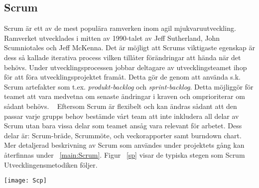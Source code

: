 \subsection{Scrum}
Scrum är ett av de mest populära ramverken inom agil mjukvaruutveckling. Ramverket utvecklades i mitten av 1990-talet av Jeff Sutherland, John Scumniotales och Jeff McKenna. Det är möjligt att Scrums viktigaste egenskap är dess så kallade iterativa process vilken tillåter förändringar att hända när det behövs. Under utvecklingsprocessen jobbar deltagare av utvecklingsteamet ihop för att föra utvecklingsprojektet framåt. Detta gör de genom att använda s.k.  Scrum artefakter som t.ex. \textit{produkt-backlog} och \textit{sprint-backlog}. Detta möjliggör för teamet att vara medvetna om senaste ändringar i kraven och omprioriterar om sådant behövs. ~\cite{aamir2017incorporating} Eftersom Scrum är flexibelt och kan ändras sådant att den passar varje grupps behov bestämde vårt team att inte inkludera all delar av Scrum utan bara vissa delar som teamet ansåg vara relevant för arbetet. Dess delar är: Scrum-bräde, Scrummöte, och veckorapporter samt burndown chart. Mer detaljerad beskrivning av Scrum som användes under projektets gång kan återfinnas under ~\ref{main:Scrum}. Figur ~\ref{sp} visar de typiska stegen som Scrum Utvecklingensmetodiken följer.
\begin{figure*}[h]
	\centering
	\texttt{[image: Scp]}
	\caption[De typiska stegen som följs i Scrum]{De typiska stegen som följs i Scrum~\cite{Scrumprocess}}
	\label{sp}
\end{figure*}
\newpage